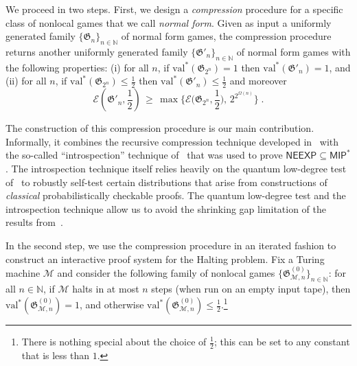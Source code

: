 \documentclass[11pt]{article}
\theoremstyle{definition}
\newcommand{\N}{\ensuremath{\mathbb{N}}}
\newcommand{\cM}{\ensuremath{\mathcal{M}}}
\newcommand{\val}{\ensuremath{\mathrm{val}}}
\newcommand{\game}{\mathfrak{G}}
\newcommand{\class}[1]{\ensuremath{\mathsf{#1}}\xspace}
\newcommand{\MIP}{\class{MIP}} %
\newcommand{\NEEXP}{\class{NEEXP}} %
\newcommand{\Ent}{\mathscr{E}}
\newcommand{\hnote}[1]{}
\begin{document}
We proceed in two steps. First, we design a \emph{compression} procedure for a specific class of nonlocal games that we call \emph{normal form}. Given as input a uniformly generated family $\{ \game_{n} \}_{n \in \N}$ of normal form games, the compression procedure returns another uniformly generated family $\{\game'_{n}\}_{n \in \N}$ of normal form games with the following properties: (i) for all $n$, if $\val^*(\game_{2^n})=1$ then $\val^*(\game'_n)=1$, and (ii) for all $n$, if $\val^*(\game_{2^n})\leq \frac{1}{2}$ then $\val^*(\game'_n)\leq \frac{1}{2}$ and moreover
\[ \Ent(\game'_{n},\frac{1}{2})\,\geq\, \max \Big\{ \Ent\Big(\game_{2^n},\frac{1}{2}\Big), \,2^{2^{\Omega(n)}} \Big\}\;.\] 

The construction of this compression procedure is our main contribution. Informally, it combines the recursive compression technique developed in~\cite{ji2017compression,fitzsimons2018quantum} with the so-called ``introspection'' technique of~\cite{NW19} that was used to prove $\NEEXP \subseteq \MIP^*$. The introspection technique itself relies heavily on the quantum low-degree test of~\cite{natarajan2018low} to robustly self-test certain distributions that arise from constructions of \emph{classical} probabilistically checkable proofs. The quantum low-degree test and the introspection technique allow us to avoid the shrinking gap limitation of the results from~\cite{fitzsimons2018quantum}. 



In the second step, we use the compression procedure in an iterated fashion to construct an interactive proof system for the Halting problem. Fix a Turing machine $\cM$ and consider the following family  of nonlocal games $\{\game_{\cM,n}^{(0)}\}_{n\in\N}$: for all $n \in \N$, if $\cM$ halts in at most $n$ steps (when run on an empty input tape), then $\val^*(\game_{\cM,n}^{(0)})=1$, and otherwise  $\val^*(\game_{\cM,n}^{(0)}) \leq \frac{1}{2}$.\footnote{There is nothing special about the choice of $\frac{1}{2}$; this can be set to any constant that is less than $1$.} 
\end{document}
